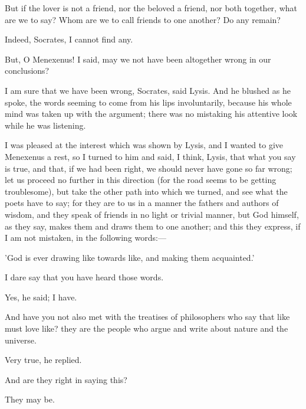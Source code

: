 \documentclass[11pt,letter]{article}
\begin{document}
\par  But if the lover is not a friend, nor the beloved a friend, nor both together, what are we to say? Whom are we to call friends to one another? Do any remain?

\par  Indeed, Socrates, I cannot find any.

\par  But, O Menexenus! I said, may we not have been altogether wrong in our conclusions?

\par  I am sure that we have been wrong, Socrates, said Lysis. And he blushed as he spoke, the words seeming to come from his lips involuntarily, because his whole mind was taken up with the argument; there was no mistaking his attentive look while he was listening.

\par  I was pleased at the interest which was shown by Lysis, and I wanted to give Menexenus a rest, so I turned to him and said, I think, Lysis, that what you say is true, and that, if we had been right, we should never have gone so far wrong; let us proceed no further in this direction (for the road seems to be getting troublesome), but take the other path into which we turned, and see what the poets have to say; for they are to us in a manner the fathers and authors of wisdom, and they speak of friends in no light or trivial manner, but God himself, as they say, makes them and draws them to one another; and this they express, if I am not mistaken, in the following words:—

\par  'God is ever drawing like towards like, and making them acquainted.'

\par  I dare say that you have heard those words.

\par  Yes, he said; I have.

\par  And have you not also met with the treatises of philosophers who say that like must love like? they are the people who argue and write about nature and the universe.

\par  Very true, he replied.

\par  And are they right in saying this?

\par  They may be.
\end{document}
